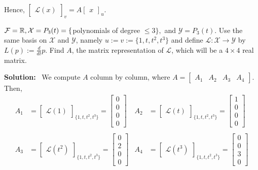 Hence, $ \begin{bmatrix} \mathcal{L}(x) \end{bmatrix}_v = A \begin{bmatrix} x \end{bmatrix}_u.$ \Qed

\vspace*{.2in}

\begin{example}
    $\mathcal{F} = \mathbb R, \mathcal{X} = P_3(t) =\{ $polynomials of degree $\leq 3 \},$ and $\mathcal{Y} = P_3(t)$. Use the same basis on $\mathcal{X}$ and $\mathcal{Y}$, namely $u:=v:=\{ 1, t, t^2, t^3\}$ and define $\mathcal{L}: \mathcal{X} \to \mathcal{Y}$ by $L(p):= \frac{d}{dt} p$. Find $A$, the matrix representation of $\mathcal{L}$, which will be a $4 \times 4$ real matrix.
    
    \end{example}

\textbf{Solution:}~ We compute $A$ column by column, where $A = \begin{bmatrix} A_1 & A_2 & A_3 & A_4 \end{bmatrix}$.  Then,
    \begin{align*}
        A_1 &= \begin{bmatrix}\mathcal{L}(1)\end{bmatrix}_{ \{1, t, t^2, t^3\} } = \begin{bmatrix}0 \\ 0 \\ 0 \\ 0  \end{bmatrix} &
        A_2 &= \begin{bmatrix}\mathcal{L}(t)\end{bmatrix}_{ \{1, t, t^2, t^3\} } = \begin{bmatrix}1 \\ 0 \\ 0 \\ 0  \end{bmatrix}\\
        \\
        A_3 &= \begin{bmatrix}\mathcal{L}(t^2)\end{bmatrix}_{ \{1, t, t^2, t^3\} } = \begin{bmatrix}0 \\ 2 \\ 0 \\ 0  \end{bmatrix} &
        A_4 &= \begin{bmatrix}\mathcal{L}(t^3)\end{bmatrix}_{ \{1, t, t^2, t^3\} } = \begin{bmatrix}0 \\ 0 \\ 3 \\ 0  \end{bmatrix}
    \end{align*}

